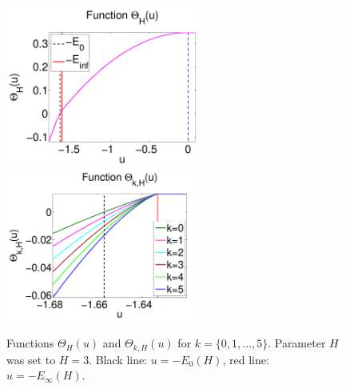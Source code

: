 \documentclass[twoside]{article}
\begin{document}
\begin{figure}[htp!]
  \center
\includegraphics[width = 2.5in]{Theta_cp.pdf} 
\includegraphics[width = 2.5in]{Theta_lm_sp.pdf}
\caption{Functions $\Theta_H(u)$ and $\Theta_{k,H}(u)$ for $k = \{0,1,\dots,5\}$. Parameter $H$ was set to $H = 3$. Black line: $u = -E_0(H)$, red line: $u = -E_{\infty}(H)$.}
\label{fig:Thetas}
\end{figure}
\end{document}

